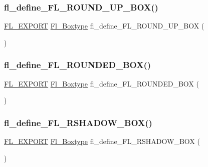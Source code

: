 \subsubsection{\texorpdfstring{fl\+\_\+define\+\_\+\+F\+L\+\_\+\+R\+O\+U\+N\+D\+\_\+\+U\+P\+\_\+\+B\+O\+X()}{fl\_define\_FL\_ROUND\_UP\_BOX()}}
{\footnotesize\ttfamily \hyperlink{_fl___export_8_h_aa9ba29a18aee9d738370a06eeb4470fc}{F\+L\+\_\+\+E\+X\+P\+O\+RT} \hyperlink{_enumerations_8_h_ae48bf9070f8541de17829f54ccacc6bc}{Fl\+\_\+\+Boxtype} fl\+\_\+define\+\_\+\+F\+L\+\_\+\+R\+O\+U\+N\+D\+\_\+\+U\+P\+\_\+\+B\+OX (\begin{DoxyParamCaption}{ }\end{DoxyParamCaption})}

\mbox{\label{_enumerations_8_h_a5830cccb7640d9fb61c1067200b4b9d2}} 
\subsubsection{\texorpdfstring{fl\+\_\+define\+\_\+\+F\+L\+\_\+\+R\+O\+U\+N\+D\+E\+D\+\_\+\+B\+O\+X()}{fl\_define\_FL\_ROUNDED\_BOX()}}
{\footnotesize\ttfamily \hyperlink{_fl___export_8_h_aa9ba29a18aee9d738370a06eeb4470fc}{F\+L\+\_\+\+E\+X\+P\+O\+RT} \hyperlink{_enumerations_8_h_ae48bf9070f8541de17829f54ccacc6bc}{Fl\+\_\+\+Boxtype} fl\+\_\+define\+\_\+\+F\+L\+\_\+\+R\+O\+U\+N\+D\+E\+D\+\_\+\+B\+OX (\begin{DoxyParamCaption}{ }\end{DoxyParamCaption})}

\mbox{\label{_enumerations_8_h_a7c68477f8da9f5fc9af0b1d0e20d79a3}} 
\subsubsection{\texorpdfstring{fl\+\_\+define\+\_\+\+F\+L\+\_\+\+R\+S\+H\+A\+D\+O\+W\+\_\+\+B\+O\+X()}{fl\_define\_FL\_RSHADOW\_BOX()}}
{\footnotesize\ttfamily \hyperlink{_fl___export_8_h_aa9ba29a18aee9d738370a06eeb4470fc}{F\+L\+\_\+\+E\+X\+P\+O\+RT} \hyperlink{_enumerations_8_h_ae48bf9070f8541de17829f54ccacc6bc}{Fl\+\_\+\+Boxtype} fl\+\_\+define\+\_\+\+F\+L\+\_\+\+R\+S\+H\+A\+D\+O\+W\+\_\+\+B\+OX (\begin{DoxyParamCaption}{ }\end{DoxyParamCaption})}

